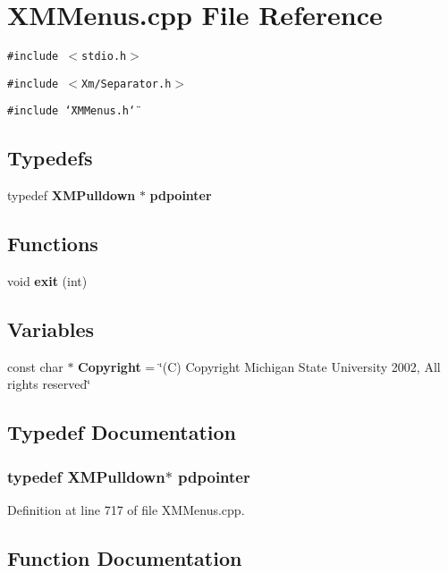 \section{XMMenus.cpp File Reference}
\label{XMMenus_8cpp}
{\tt \#include $<$stdio.h$>$}\par
{\tt \#include $<$Xm/Separator.h$>$}\par
{\tt \#include \char`\"{}XMMenus.h\char`\"{}}\par
\subsection*{Typedefs}
\begin{CompactItemize}
\item 
typedef {\bf XMPulldown} $\ast$ {\bf pdpointer}
\end{CompactItemize}
\subsection*{Functions}
\begin{CompactItemize}
\item 
void {\bf exit} (int)
\end{CompactItemize}
\subsection*{Variables}
\begin{CompactItemize}
\item 
const char $\ast$ {\bf Copyright} = \char`\"{}(C) Copyright Michigan State University 2002, All rights reserved\char`\"{}
\end{CompactItemize}


\subsection{Typedef Documentation}
\subsubsection{\setlength{\rightskip}{0pt plus 5cm}typedef {\bf XMPulldown}$\ast$ pdpointer}\label{XMMenus_8cpp_a1}




Definition at line 717 of file XMMenus.cpp.

\subsection{Function Documentation}
